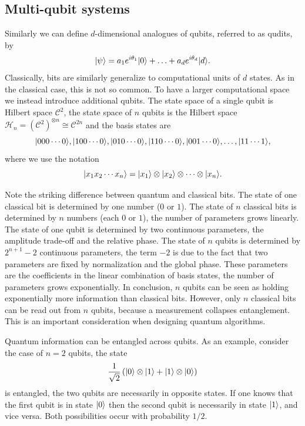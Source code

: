 \documentclass[a4paper,10pt,oneside]{book}
\theoremstyle{plain}
\theoremstyle{definition}
\theoremstyle{remark}
\DeclarePairedDelimiter\ket{\lvert}{\rangle}
\begin{document}
\subsection{Multi-qubit systems} Similarly we can define $d$-dimensional analogues of qubits, referred to as qudits, by
\begin{equation}
  \ket{\psi} = a_1 e^{i\theta_1} \ket{0} + \ldots + a_d e^{i \theta_d} \ket{d}.
\end{equation}
Classically, bits are similarly generalize to computational units of $d$ states. As in the classical case, this is not so common. To have a larger computational space we instead introduce additional qubits. The state space of a single qubit is Hilbert space $\mathcal{C}^2$, the state space of $n$ qubits is the Hilbert space $\mathcal{H}_n = (\mathcal{C}^2)^{\otimes n} \cong \mathcal{C}^{2n}$ and the basis states are
\begin{equation}
  \ket{000\cdots0},
  \ket{100\cdots0},
  \ket{010\cdots0},
  \ket{110\cdots0},
  \ket{001\cdots0},
  \ldots,
  \ket{11\cdots1},
\end{equation}
where we use the notation
\begin{equation}
  \ket{x_1x_2\cdots x_n} = \ket{x_1}\otimes\ket{x_2}\otimes\cdots\otimes\ket{x_n}.
\end{equation}

Note the striking difference between quantum and classical bits. The state of one classical bit is determined by one number ($0$ or $1$). The state of $n$ classical bits is determined by $n$ numbers (each $0$ or $1$), the number of parameters grows linearly. The state of one qubit is determined by two continuous parameters, the amplitude trade-off and the relative phase. The state of $n$ qubits is determined by $2^{n+1}-2$ continuous parameters, the term $-2$ is due to the fact that two parameters are fixed by normalization and the global phase. These parameters are the coefficients in the linear combination of basis states, the number of parameters grows exponentially. In conclusion, $n$ qubits can be seen as holding exponentially more information than classical bits. However, only $n$ classical bits can be read out from $n$ qubits, because a measurement collapses entanglement. This is an important consideration when designing quantum algorithms.

Quantum information can be entangled across qubits. As an example, consider the case of $n = 2$ qubits, the state
\begin{equation}
  \frac{1}{\sqrt{2}}\left(\ket{0}\otimes\ket{1} + \ket{1}\otimes\ket{0}\right)
\end{equation}
is entangled, the two qubits are necessarily in opposite states. If one knows that the first qubit is in state $\ket{0}$ then the second qubit is necessarily in state $\ket{1}$, and vice versa. Both possibilities occur with probability $1/2$.
\end{document}
